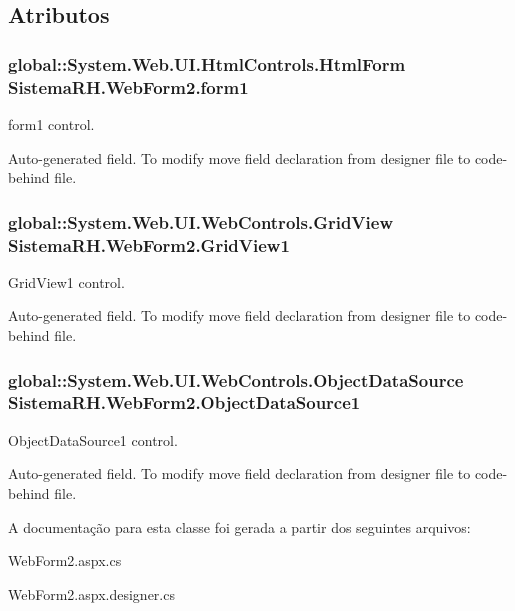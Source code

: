 \subsection{Atributos}
\hypertarget{class_sistema_r_h_1_1_web_form2_a4cd20c1aed78d91db68974b5d568dc80}{
\subsubsection[{form1}]{\setlength{\rightskip}{0pt plus 5cm}global::System.Web.UI.HtmlControls.HtmlForm {\bf SistemaRH.WebForm2.form1}}}
\label{class_sistema_r_h_1_1_web_form2_a4cd20c1aed78d91db68974b5d568dc80}


form1 control. 

Auto-\/generated field. To modify move field declaration from designer file to code-\/behind file. \hypertarget{class_sistema_r_h_1_1_web_form2_a8e21dcacbf8b6417b31a14bb872f784e}{
\subsubsection[{GridView1}]{\setlength{\rightskip}{0pt plus 5cm}global::System.Web.UI.WebControls.GridView {\bf SistemaRH.WebForm2.GridView1}}}
\label{class_sistema_r_h_1_1_web_form2_a8e21dcacbf8b6417b31a14bb872f784e}


GridView1 control. 

Auto-\/generated field. To modify move field declaration from designer file to code-\/behind file. \hypertarget{class_sistema_r_h_1_1_web_form2_a308e7686dc9dd73babcd0c2cf737aeb4}{
\subsubsection[{ObjectDataSource1}]{\setlength{\rightskip}{0pt plus 5cm}global::System.Web.UI.WebControls.ObjectDataSource {\bf SistemaRH.WebForm2.ObjectDataSource1}}}
\label{class_sistema_r_h_1_1_web_form2_a308e7686dc9dd73babcd0c2cf737aeb4}


ObjectDataSource1 control. 

Auto-\/generated field. To modify move field declaration from designer file to code-\/behind file. 

A documentação para esta classe foi gerada a partir dos seguintes arquivos:\begin{DoxyCompactItemize}
\item 
WebForm2.aspx.cs\item 
WebForm2.aspx.designer.cs\end{DoxyCompactItemize}
